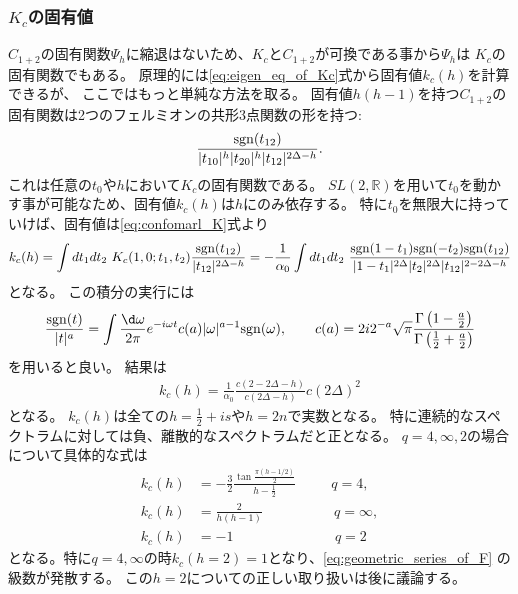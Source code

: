 \subsubsection{$K_c$の固有値}
$C_{1+2}$の固有関数$\Psi_h$に縮退はないため、$K_c$と$C_{1+2}$が可換である事から$\Psi_h$は
$K_c$の固有関数でもある。
原理的には\eqref{eq:eigen_eq_of_Kc}式から固有値$k_c(h)$を計算できるが、
ここではもっと単純な方法を取る。
固有値$h(h-1)$を持つ$C_{1+2}$の固有関数は2つのフェルミオンの共形3点関数の形を持つ:
\begin{align}
	\frac{\mathrm{sgn}(t_{12})}{|t_{10}|^h|t_{20}|^h|t_{12}|^{2\Delta - h}}.
\end{align}
これは任意の$t_0$や$h$において$K_c$の固有関数である。
$SL(2, \mathbb{R})$を用いて$t_0$を動かす事が可能なため、固有値$k_c(h)$は$h$にのみ依存する。
特に$t_0$を無限大に持っていけば、固有値は\eqref{eq:confomarl_K}式より
\begin{align}
	k_c(h)
	= \int dt_1 dt_2\ K_c(1, 0; t_1, t_2)\frac{\sgn(t_{12})}{|t_{12}|^{2\Delta - h}}
	= -\frac{1}{\alpha_0}\int dt_1dt_2\ 
	\frac{\sgn(1 - t_1)\sgn(-t_2)\sgn(t_{12})}
	{|1-t_1|^{2\Delta}|t_2|^{2\Delta}|t_{12}|^{2-2\Delta-h}}
\end{align}
となる。
この積分の実行には
\begin{align}
	\frac{\sgn(t)}{|t|^a} = \int\frac{\d\omega}{2\pi}
		e^{-i\omega t}c(a)|\omega|^{a-1}\sgn(\omega),\hspace{20pt}
		c(a) = 2i2^{-a}\sqrt{\pi}
		\frac{\Gamma\left(1-\frac{a}{2}\right)}{\Gamma\left(\frac{1}{2}+\frac{a}{2}\right)}
\end{align}
を用いると良い。
結果は
\begin{align}
	k_c(h) = \frac{1}{\alpha_0}\frac{c(2-2\Delta-h)}{c(2\Delta-h)}c(2\Delta)^2
	\label{eq:eigenvalue_of_Kc}
\end{align}
となる。
$k_c(h)$は全ての$h = \frac{1}{2} + is$や$h = 2n$で実数となる。
特に連続的なスペクトラムに対しては負、離散的なスペクトラムだと正となる。
$q = 4, \infty, 2$の場合について具体的な式は
\begin{align}
	k_c(h) &= -\frac{3}{2}\frac{\tan\frac{\pi(h - 1/2)}{2}}{h - \frac{1}{2}}
	\hspace{30pt}q = 4,\\
	k_c(h) &= \frac{2}{h(h-1)}
	\hspace{61pt}q = \infty,\\
	k_c(h) &= -1
	\hspace{87pt}q = 2
\end{align}
となる。特に$q = 4, \infty$の時$k_c(h=2) = 1$となり、\eqref{eq:geometric_series_of_F}
の級数が発散する。
この$h = 2$についての正しい取り扱いは後に議論する。

